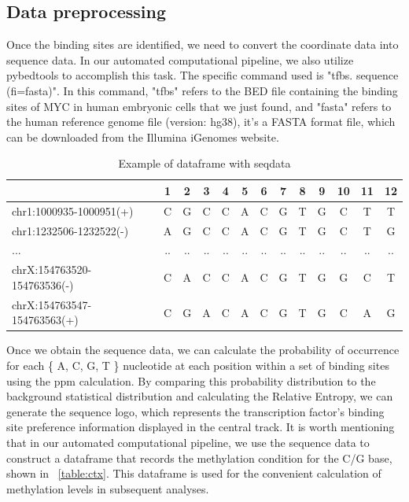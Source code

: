 \documentclass{PHlab-thesis}
\begin{document}
\subsection{Data preprocessing} \label{sssec:num1}
Once the binding sites are identified, we need to convert the coordinate data into sequence data. In our automated computational pipeline, we also utilize pybedtools to accomplish this task. The specific command used is "tfbs. sequence (fi=fasta)". In this command, "tfbs" refers to the BED file containing the binding sites of MYC in human embryonic cells that we just found, and "fasta" refers to the human reference genome file (version: hg38), it's a FASTA format file, which can be downloaded from the Illumina iGenomes website.
\begin{table}[H]
	\centering
	\begin{tabular}{l*{12}{c}}
		\toprule
		         & 1 &  2&  3&4  &5&6&7&8&  9& 10 & 11&12\\
		\midrule
		chr1:1000935-1000951(+)     & C  &G  &C  &C  &A  &C  &G  &T  &G  &C  &T  &T		\\
		chr1:1232506-1232522(-)      &A  &G  &C  &C  &A  &C  &G  &T  &G  &C  &T  &G\\
		...   &.. &.. &.. &.. &.. &.. &.. &.. &.. &.. &.. &..\\
		
		chrX:154763520-154763536(-)  &C  &A  &C & C & A  &C  &G  &T  &G  &G  &C  &T\\
		chrX:154763547-154763563(+) & C  &G  &A  &C  &A  &C  &G  &T  &G  &C  &A  &G\\
		\bottomrule
	\end{tabular}
	\caption{Example of dataframe with seqdata}
	\label{table:seqdata}
\end{table}
Once we obtain the sequence data, we can calculate the probability of occurrence for each \{ A, C, G, T \} nucleotide at each position within a set of binding sites using the ppm calculation. By comparing this probability distribution to the background statistical distribution and calculating the Relative Entropy, we can generate the sequence logo, which represents the transcription factor's binding site preference information displayed in the central track. It is worth mentioning that in our automated computational pipeline, we use the sequence data to construct a dataframe that records the methylation condition for the C/G base, shown in ~\ref{table:ctx}. This dataframe is used for the convenient calculation of methylation levels in subsequent analyses.
\end{document}

